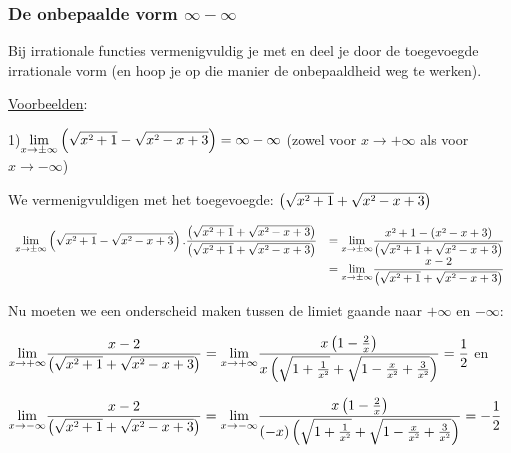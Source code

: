 \subsubsection{De onbepaalde vorm $\infty-\infty$}

Bij irrationale functies vermenigvuldig je met en deel je door de
toegevoegde irrationale vorm (en hoop je op die manier de onbepaaldheid
weg te werken).

\medskip{}


\uline{Voorbeelden}:

\medskip{}


1)${\displaystyle {\displaystyle \lim_{x\to\pm\infty}}\left(\sqrt{x\text{\texttwosuperior}+1}-\sqrt{x\text{\texttwosuperior}-x+3}\right)=\infty-\infty}$
(zowel voor $x\rightarrow+\infty$ als voor $x\rightarrow-\infty$)

We vermenigvuldigen met het toegevoegde: $\left(\sqrt{x\text{\texttwosuperior}+1}+\sqrt{x\text{\texttwosuperior}-x+3}\right)$

$\begin{array}{cl}
{\displaystyle {\displaystyle \lim_{x\to\pm\infty}}\left(\sqrt{x\text{\texttwosuperior}+1}-\sqrt{x\text{\texttwosuperior}-x+3}\right).\frac{\left(\sqrt{x\text{\texttwosuperior}+1}+\sqrt{x\text{\texttwosuperior}-x+3}\right)}{\left(\sqrt{x\text{\texttwosuperior}+1}+\sqrt{x\text{\texttwosuperior}-x+3}\right)}} & {\displaystyle ={\displaystyle \lim_{x\to\pm\infty}}\frac{x\text{\texttwosuperior}+1-(x\text{\texttwosuperior}-x+3)}{\left(\sqrt{x\text{\texttwosuperior}+1}+\sqrt{x\text{\texttwosuperior}-x+3}\right)}}\\
 & {\displaystyle ={\displaystyle \lim_{x\to\pm\infty}}\frac{x-2}{\left(\sqrt{x\text{\texttwosuperior}+1}+\sqrt{x\text{\texttwosuperior}-x+3}\right)}}
\end{array}$

Nu moeten we een onderscheid maken tussen de limiet gaande naar $+\infty$
en $-\infty$:

${\displaystyle {\displaystyle \lim_{x\to+\infty}}\frac{x-2}{\left(\sqrt{x\text{\texttwosuperior}+1}+\sqrt{x\text{\texttwosuperior}-x+3}\right)}={\displaystyle \lim_{x\to+\infty}}\frac{x\left(1-\frac{2}{x}\right)}{x\left(\sqrt{1+\frac{1}{x\text{\texttwosuperior}}}+\sqrt{1-\frac{x}{x\text{\texttwosuperior}}+\frac{3}{x\text{\texttwosuperior}}}\right)}=\frac{1}{2}}$ en

${\displaystyle {\displaystyle \lim_{x\to-\infty}}\frac{x-2}{\left(\sqrt{x\text{\texttwosuperior}+1}+\sqrt{x\text{\texttwosuperior}-x+3}\right)}={\displaystyle \lim_{x\to-\infty}}\frac{x\left(1-\frac{2}{x}\right)}{(-x)\left(\sqrt{1+\frac{1}{x\text{\texttwosuperior}}}+\sqrt{1-\frac{x}{x\text{\texttwosuperior}}+\frac{3}{x\text{\texttwosuperior}}}\right)}=-\frac{1}{2}}$


